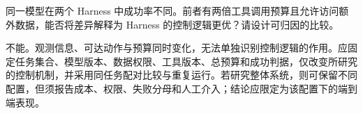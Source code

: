\begin{exercises}
\begin{exercise} 同一模型在两个 Harness 中成功率不同。前者有两倍工具调用预算且允许访问额外数据，能否将差异解释为 Harness 的控制逻辑更优？请设计可归因的比较。

\begin{solution}

不能。观测信息、可达动作与预算同时变化，无法单独识别控制逻辑的作用。应固定任务集合、模型版本、数据权限、工具版本、总预算和成功判据，仅改变所研究的控制机制，并采用同任务配对比较与重复运行。若研究整体系统，则可保留不同配置，但须报告成本、权限、失败分母和人工介入；结论应限定为该配置下的端到端表现。
\end{solution}
\end{exercise}

\end{exercises}
